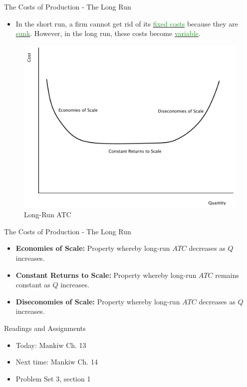 \documentclass[xcolor={dvipsnames},pdf, hyperref={colorlinks=true, citecolor=ForestGreen, linkcolor=BlueViolet, urlcolor=Magenta}]{beamer}
\newcommand{\defn}[1]{\textbf{#1}}
\newcommand{\dd}[1]{{\underline{\textcolor{ForestGreen}{#1}}}}
\begin{document}
\begin{frame}{The Costs of Production - The Long Run}
\begin{itemize}
	\item 	In the short run, a firm cannot get rid of its \dd{fixed costs} because they are \dd{sunk}. However, in the long run, these costs become \dd{variable}.
\end{itemize}
	\begin{figure}[H]
		\centering
		\includegraphics[scale=.3]{plot60.pdf}
		\caption{Long-Run ATC}
	\end{figure}
\end{frame}

\begin{frame}{The Costs of Production - The Long Run}
\begin{itemize}

		\item \defn{Economies of Scale:} Property whereby long-run $ATC$ decreases as $Q$ increases.
		\item \defn{Constant Returns to Scale:} Property whereby long-run $ATC$ remains constant as $Q$ increases.
		\item \defn{Diseconomies of Scale:}  Property whereby long-run $ATC$ decreases as $Q$ increases.
\end{itemize}
\end{frame}



\begin{frame}{Readings and Assignments}
\begin{itemize}
	\item Today: Mankiw Ch. 13
	\item Next time: Mankiw Ch. 14
	\item Problem Set 3, section 1
\end{itemize}
\end{frame}
\end{document}
